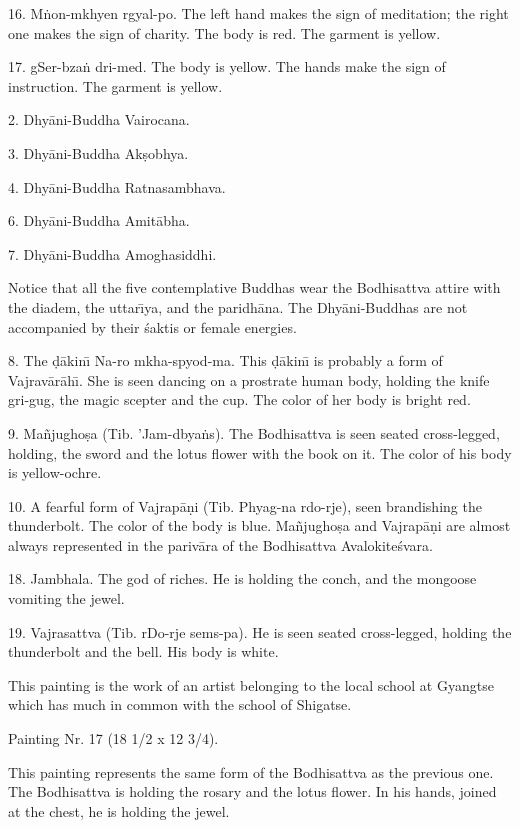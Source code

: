 \documentclass[a4paper, 12pt, oneside]{article}
\begin{document}
16. M\.{n}on-mkhyen rgyal-po. The left hand makes the sign of meditation; the right one makes the sign of charity. The body is red. The garment is yellow.

17. gSer-bza\.{n} dri-med. The body is yellow. The hands make the sign of instruction. The garment is yellow.

2. Dhy\={a}ni-Buddha Vairocana.

3. Dhy\={a}ni-Buddha Ak\d{s}obhya.

4. Dhy\={a}ni-Buddha Ratnasambhava.

6. Dhy\={a}ni-Buddha Amit\={a}bha.

7. Dhy\={a}ni-Buddha Amoghasiddhi.

Notice that all the five contemplative Buddhas wear the Bodhisattva attire with the diadem, the uttar\={\i}ya, and the paridh\={a}na. The Dhy\={a}ni-Buddhas are not accompanied by their \'{s}aktis or female energies.

8. The \d{d}\={a}kin\={\i} Na-ro mkha-spyod-ma. This \d{d}\={a}kin\={\i} is probably a form of Vajrav\={a}r\={a}h\={\i}. She is seen dancing on a prostrate human body, holding the knife gri-gug, the magic scepter and the cup. The color of her body is bright red.

9. Ma\~{n}jugho\d{s}a (Tib. 'Jam-dbya\.{n}s). The Bodhisattva is seen seated cross-legged, holding, the sword and the lotus flower with the book on it. The color of his body is yellow-ochre.

10. A fearful form of Vajrap\={a}\d{n}i (Tib. Phyag-na rdo-rje), seen brandishing the thunderbolt. The color of the body is blue. Ma\~{n}jugho\d{s}a and Vajrap\={a}\d{n}i are almost always represented in the pariv\={a}ra of the Bodhisattva Avalokite\'{s}vara.

18. Jambhala. The god of riches. He is holding the conch, and the mongoose vomiting the jewel.

19. Vajrasattva (Tib. rDo-rje sems-pa). He is seen seated cross-legged, holding the thunderbolt and the bell. His body is white.

This painting is the work of an artist belonging to the local school at Gyangtse which has much in common with the school of Shigatse.

\bigskip

Painting Nr. 17 (18 1/2 x 12 3/4).

\bigskip

This painting represents the same form of the Bodhisattva as the previous one. The Bodhisattva is holding the rosary and the lotus flower. In his hands, joined at the chest, he is holding the jewel.
\end{document}
